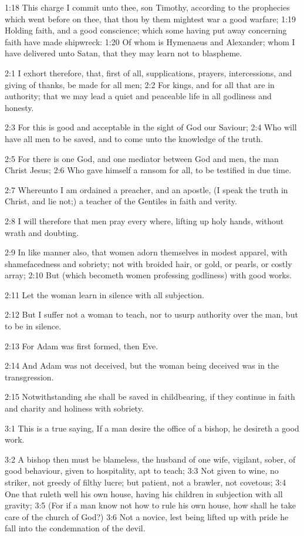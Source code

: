 1:18 This charge I commit unto thee, son Timothy, according to the
prophecies which went before on thee, that thou by them mightest war a
good warfare; 1:19 Holding faith, and a good conscience; which some
having put away concerning faith have made shipwreck: 1:20 Of whom is
Hymenaeus and Alexander; whom I have delivered unto Satan, that they
may learn not to blaspheme.

2:1 I exhort therefore, that, first of all, supplications, prayers,
intercessions, and giving of thanks, be made for all men; 2:2 For
kings, and for all that are in authority; that we may lead a quiet and
peaceable life in all godliness and honesty.

2:3 For this is good and acceptable in the sight of God our Saviour;
2:4 Who will have all men to be saved, and to come unto the knowledge
of the truth.

2:5 For there is one God, and one mediator between God and men, the
man Christ Jesus; 2:6 Who gave himself a ransom for all, to be
testified in due time.

2:7 Whereunto I am ordained a preacher, and an apostle, (I speak the
truth in Christ, and lie not;) a teacher of the Gentiles in faith and
verity.

2:8 I will therefore that men pray every where, lifting up holy hands,
without wrath and doubting.

2:9 In like manner also, that women adorn themselves in modest
apparel, with shamefacedness and sobriety; not with broided hair, or
gold, or pearls, or costly array; 2:10 But (which becometh women
professing godliness) with good works.

2:11 Let the woman learn in silence with all subjection.

2:12 But I suffer not a woman to teach, nor to usurp authority over
the man, but to be in silence.

2:13 For Adam was first formed, then Eve.

2:14 And Adam was not deceived, but the woman being deceived was in
the transgression.

2:15 Notwithstanding she shall be saved in childbearing, if they
continue in faith and charity and holiness with sobriety.

3:1 This is a true saying, If a man desire the office of a bishop, he
desireth a good work.

3:2 A bishop then must be blameless, the husband of one wife,
vigilant, sober, of good behaviour, given to hospitality, apt to
teach; 3:3 Not given to wine, no striker, not greedy of filthy lucre;
but patient, not a brawler, not covetous; 3:4 One that ruleth well his
own house, having his children in subjection with all gravity; 3:5
(For if a man know not how to rule his own house, how shall he take
care of the church of God?)  3:6 Not a novice, lest being lifted up
with pride he fall into the condemnation of the devil.

